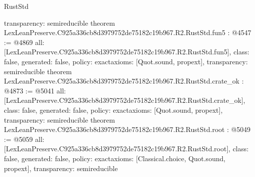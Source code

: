 \begin{lexlean}{RustStd}
\begin{coremodule}
{  transparency: semireducible
}
theorem LexLeanPreserve.C925a336cb8d3979752de75182c19b967.R2.RustStd.fun5 : @4547 := @4869 {
  all: [LexLeanPreserve.C925a336cb8d3979752de75182c19b967.R2.RustStd.fun5],
  class: false,
  generated: false,
  policy: exact{axioms: [Quot.sound, propext]},
  transparency: semireducible
}
theorem LexLeanPreserve.C925a336cb8d3979752de75182c19b967.R2.RustStd.crate_ok : @4873 := @5041 {
  all: [LexLeanPreserve.C925a336cb8d3979752de75182c19b967.R2.RustStd.crate_ok],
  class: false,
  generated: false,
  policy: exact{axioms: [Quot.sound, propext]},
  transparency: semireducible
}
theorem LexLeanPreserve.C925a336cb8d3979752de75182c19b967.R2.RustStd.root : @5049 := @5059 {
  all: [LexLeanPreserve.C925a336cb8d3979752de75182c19b967.R2.RustStd.root],
  class: false,
  generated: false,
  policy: exact{axioms: [Classical.choice, Quot.sound, propext]},
  transparency: semireducible
}


\end{coremodule}
\end{lexlean}

